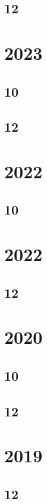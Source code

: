 \documentclass[11pt]{book}
\begin{document}
\subsection{12}

\section{2023}
\subsection{10}

\subsection{12}

\section{2022}
\subsection{10}

\section{2022}
\subsection{12}

\section{2020}
\subsection{10}

\subsection{12}

\section{2019}
\subsection{12}





\end{document}

